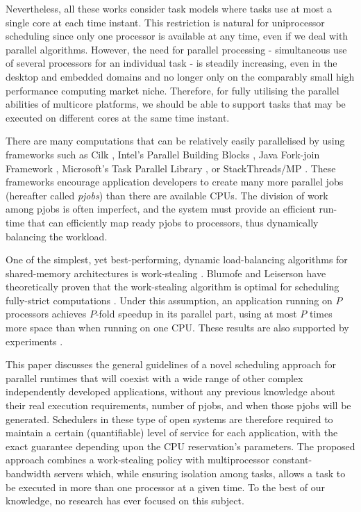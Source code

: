 \documentclass[10pt,twocolumn]{article}
\begin{document}
Nevertheless, all these works consider task models where tasks use at most a single core at each time instant. This restriction is natural for uniprocessor scheduling since only one processor is available at any time, even if we deal with parallel algorithms. However, the need for parallel processing - simultaneous use of several processors for an individual task - is steadily increasing, even in the desktop and embedded domains and no longer only on the comparably small high performance computing market niche. Therefore, for fully utilising the parallel abilities of multicore platforms, we should be able to support tasks that may be executed on different cores at the same time instant.

There are many computations that can be relatively easily parallelised by using frameworks such as Cilk \cite{frigo98}, Intel's Parallel Building Blocks \cite{intelpbb}, Java Fork-join Framework \cite{lea00}, Microsoft's Task Parallel Library \cite{microsofttpl}, or StackThreads/MP \cite{taura99}. These frameworks encourage application developers to create many more parallel jobs (hereafter called \emph{pjobs}) than there are available CPUs. The division of work among pjobs is often imperfect, and the system must provide an efficient run-time that can efficiently map ready pjobs to processors, thus dynamically balancing the workload. 

One of the simplest, yet best-performing, dynamic load-balancing algorithms for shared-memory architectures is work-stealing \cite{blumofe99}. Blumofe and Leiserson have theoretically proven that the work-stealing algorithm is optimal for scheduling fully-strict computations \cite{blumofe99}. Under this assumption, an application running on $P$ processors achieves $P$-fold speedup in its parallel part, using at most $P$ times more space than when running on one CPU. These results are also supported by experiments \cite{saha07}.

This paper discusses the general guidelines of a novel scheduling approach for parallel runtimes that will coexist with a wide range of other complex independently developed applications, without any previous knowledge about their real execution requirements, number of pjobs, and when those pjobs will be generated. Schedulers in these type of open systems are therefore required to maintain a certain (quantifiable) level of service for each application, with the exact guarantee depending upon the CPU reservation's parameters. The proposed approach combines a work-stealing policy with multiprocessor constant-bandwidth servers which, while ensuring isolation among tasks, allows a task to be executed in more than one processor at a given time. To the best of our knowledge, no research has ever focused on this subject. 
\end{document}
